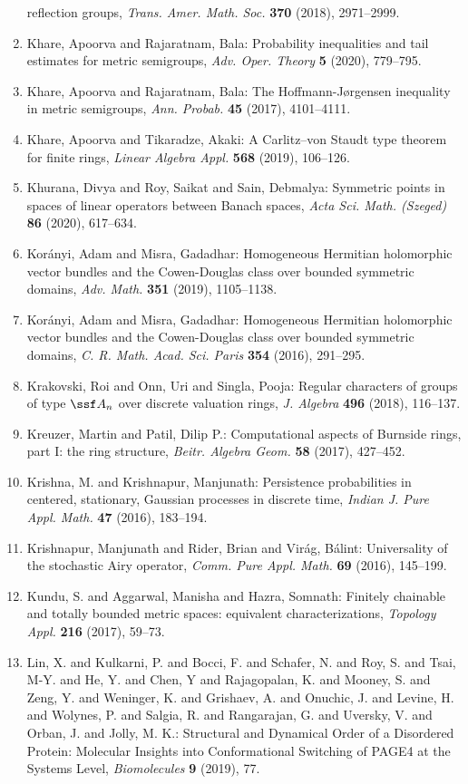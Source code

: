 \begin{enumerate}
reflection groups, \emph{Trans. Amer. Math. Soc.} {\bf 370} (2018), 2971--2999.
\item Khare, Apoorva and Rajaratnam, Bala: Probability inequalities and tail estimates for metric
semigroups, \emph{Adv. Oper. Theory} {\bf 5} (2020), 779--795.
\item Khare, Apoorva and Rajaratnam, Bala: The {H}offmann-{J}\o rgensen inequality in metric semigroups, \emph{Ann. Probab.} {\bf 45} (2017), 4101--4111.
\item Khare, Apoorva and Tikaradze, Akaki: A {C}arlitz--von {S}taudt type theorem for finite rings, \emph{Linear Algebra Appl.} {\bf 568} (2019), 106--126.
\item Khurana, Divya and Roy, Saikat and Sain, Debmalya: Symmetric points in spaces of linear operators between
{B}anach spaces, \emph{Acta Sci. Math. (Szeged)} {\bf 86} (2020), 617--634.
\item Kor\'{a}nyi, Adam and Misra, Gadadhar: Homogeneous {H}ermitian holomorphic vector bundles and the
{C}owen-{D}ouglas class over bounded symmetric domains, \emph{Adv. Math.} {\bf 351} (2019), 1105--1138.
\item Kor\'{a}nyi, Adam and Misra, Gadadhar: Homogeneous {H}ermitian holomorphic vector bundles and the
{C}owen-{D}ouglas class over bounded symmetric domains, \emph{C. R. Math. Acad. Sci. Paris} {\bf 354} (2016), 291--295.
\item Krakovski, Roi and Onn, Uri and Singla, Pooja: Regular characters of groups of type {$\ssf A_n$} over
discrete valuation rings, \emph{J. Algebra} {\bf 496} (2018), 116--137.
\item Kreuzer, Martin and Patil, Dilip P.: Computational aspects of {B}urnside rings, part {I}: the ring
structure, \emph{Beitr. Algebra Geom.} {\bf 58} (2017), 427--452.
\item Krishna, M. and Krishnapur, Manjunath: Persistence probabilities in centered, stationary, {G}aussian
processes in discrete time, \emph{Indian J. Pure Appl. Math.} {\bf 47} (2016), 183--194.
\item Krishnapur, Manjunath and Rider, Brian and Vir\'{a}g, B\'{a}lint: Universality of the stochastic {A}iry operator, \emph{Comm. Pure Appl. Math.} {\bf 69} (2016), 145--199.
\item Kundu, S. and Aggarwal, Manisha and Hazra, Somnath: Finitely chainable and totally bounded metric spaces:
equivalent characterizations, \emph{Topology Appl.} {\bf 216} (2017), 59--73.
\item Lin, X. and Kulkarni, P. and Bocci, F. and Schafer, N. and Roy, S. and Tsai, M-Y. and He, Y. and Chen, Y and Rajagopalan, K. and Mooney, S. and Zeng, Y. and Weninger, K. and Grishaev, A. and Onuchic, J. and Levine, H. and Wolynes, P. and Salgia, R. and Rangarajan, G. and Uversky, V. and Orban, J. and Jolly, M. K.: Structural and Dynamical Order of a Disordered Protein: Molecular Insights into Conformational Switching of PAGE4 at the Systems Level, \emph{Biomolecules} {\bf 9} (2019), 77.

\end{enumerate}

